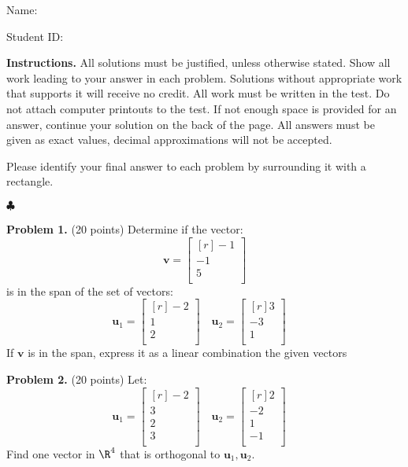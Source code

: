 \documentclass[12pt]{article}
\begin{document}
Name: \hrulefill

\bigskip
Student ID: \hrulefill

\bigskip
\textbf{Instructions.} All solutions must be justified, unless otherwise stated. Show all work leading to your answer in each problem. Solutions without appropriate work that supports it will receive no credit. All work must be written in the test. Do not attach computer printouts to the test. If not enough space is provided for an answer, continue your solution on the back of the page. All answers must be given as exact values, decimal approximations will not be accepted.

Please identify your final answer to each problem by surrounding it with a rectangle.

\vfill
\hfill$\clubsuit$

\clearpage

\textbf{Problem 1.} (20 points)
Determine if the vector:
\[
\mathbf{v}=\begin{bmatrix*}[r]-1\\ -1\\ 5\\ \end{bmatrix*}
\]
is in the span of the set of vectors:
\[
\mathbf{u}_1=\begin{bmatrix*}[r]-2\\ 1\\ 2\\ \end{bmatrix*}\quad
\mathbf{u}_2=\begin{bmatrix*}[r]3\\ -3\\ 1\\ \end{bmatrix*}\quad
\]
If $\mathbf{v}$ is in the span, 
express it as a linear combination the given vectors


\clearpage


\textbf{Problem 2.} (20 points) 
Let:
\[\mathbf{u}_1=\begin{bmatrix*}[r]-2\\ 3\\ 2\\ 3\\ \end{bmatrix*}\quad
\mathbf{u}_2=\begin{bmatrix*}[r]2\\ -2\\ 1\\ -1\\ \end{bmatrix*}\quad
\]
Find one vector in $\R^{4}$ that is orthogonal to $\textbf{u}_1, \textbf{u}_2$.
\end{document}
